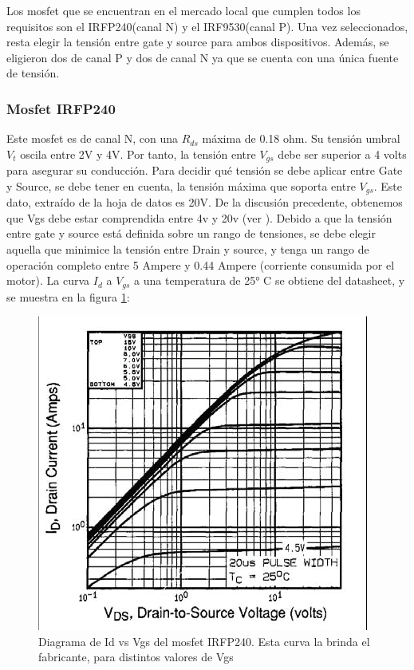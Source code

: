 Los mosfet que se encuentran en el mercado local que cumplen todos los requisitos son el IRFP240(canal N) y el IRF9530(canal P). Una vez seleccionados, resta elegir la tensión entre gate y source para ambos dispositivos. Además, se eligieron dos de canal P y dos de canal N ya que se cuenta con una única fuente de tensión. 


\subsubsection{Mosfet IRFP240} 

Este mosfet es de canal N, con una $R_{ds}$ máxima de 0.18 ohm. Su tensión umbral $V_{t}$ oscila entre 2V y 4V. Por tanto, la tensión entre $V_{gs}$ debe ser superior a 4 volts para asegurar su conducción. Para decidir qué tensión se debe aplicar entre Gate y Source, se debe tener en cuenta, la tensión máxima que soporta entre $V_{gs}$. Este dato, extraído de la hoja de datos es 20V. De la discusión precedente, obtenemos que Vgs debe estar comprendida entre 4v y 20v (ver \cite{IRFP240}). 
Debido a que la tensión entre gate y source está definida sobre un rango de tensiones, se debe elegir aquella que minimice la tensión entre Drain y source, y tenga un rango de operación completo entre 5 Ampere y 0.44 Ampere (corriente consumida por el motor). La curva $I_d$ a $V_{gs}$ a una temperatura de 25° C se obtiene del datasheet, y se muestra en la figura \ref{fig:irfp_240_id_vs_vds}: 

\begin{figure}[ht!]
	\includegraphics{curva_datasheet_1} 
	\caption{Diagrama de Id vs Vgs del mosfet IRFP240. Esta curva la brinda el fabricante, para distintos valores de Vgs}
	\label{fig:irfp_240_id_vs_vds}
\end{figure}

